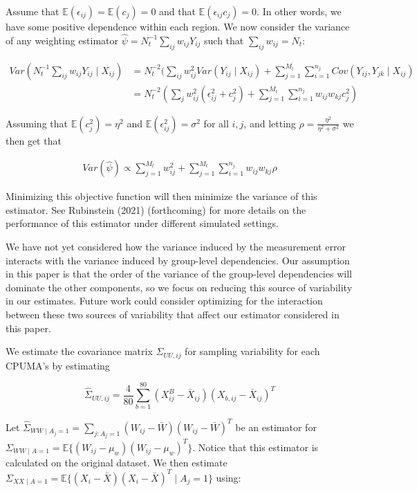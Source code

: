 \documentclass[12pt]{article}
\begin{document}
Assume that $\mathbb{E}(\epsilon_{ij}) = \mathbb{E}(c_j) = 0$ and that $\mathbb{E}(\epsilon_{ij}c_j) = 0$. In other words, we have some positive dependence within each region. We now consider the variance of any weighting estimator $\hat{\psi} = N_t^{-1}\sum_{ij}w_{ij}Y_{ij}$ such that $\sum_{ij} w_{ij} = N_t$:

\begin{align*}
    Var(N_t^{-1}\sum_{ij}w_{ij}Y_{ij} \mid X_{ij}) &= N_t^{-2}(\sum_{ij}w_{ij}^2Var(Y_{ij} \mid X_{ij}) + \sum_{j=1}^{M_t}\sum_{i=1}^{n_j}Cov(Y_{ij}, Y_{jk} \mid X_{ij}) \\
    &= N_t^{-2} (\sum_j w_{ij}^2(\epsilon_{ij}^2 + c_j^2) + \sum_{j=1}^{M_t}\sum_{i=1}^{n_j}w_{ij}w_{kj}c_j^2)
\end{align*}

Assuming that $\mathbb{E}(c_j^2) = \eta^2$ and $\mathbb{E}(\epsilon_{ij}^2) = \sigma^2$ for all $i, j$, and letting $\rho = \frac{\eta^2}{\eta^2 + \sigma^2}$ we then get that

\begin{align*}
    Var(\hat{\psi}) \propto \sum_{j=1}^{M_t} w_{ij}^2 + \sum_{j=1}^{M_t}\sum_{i=1}^{n_j}w_{ij}w_{kj}\rho
\end{align*}

Minimizing this objective function will then minimize the variance of this estimator. See Rubinstein (2021) (forthcoming) for more details on the performance of this estimator under different simulated settings.

We have not yet considered how the variance induced by the measurement error interacts with the variance induced by group-level dependencies. Our assumption in this paper is that the order of the variance of the group-level dependencies will dominate the other components, so we focus on reducing this source of variability in our estimates. Future work could consider optimizing for the interaction between these two sources of variability that affect our estimator considered in this paper.


We estimate the covariance matrix $\Sigma_{UU, ij}$ for sampling variability for each CPUMA's by estimating

$$
\hat{\Sigma}_{UU, ij} = \frac{4}{80}\sum_{b=1}^{80}(X_{ij}^B - \bar{X}_{ij})(X_{b, ij} - \bar{X}_{ij})^T
$$

Let $\hat{\Sigma}_{WW \mid A_j = 1} = \sum_{j: A_j = 1} (W_{ij} - \bar{W})(W_{ij} - \bar{W})^T$ be an estimator for $\Sigma_{WW \mid A = 1} = \mathbb{E}\{(W_{ij} - \mu_w)(W_{ij} - \mu_w)^T\}$. Notice that this estimator is calculated on the original dataset. We then estimate $\Sigma_{XX \mid A = 1} = \mathbb{E}\{(X_i - \bar{X})(X_i - \bar{X})^T \mid A_j = 1\}$ using:
\end{document}
